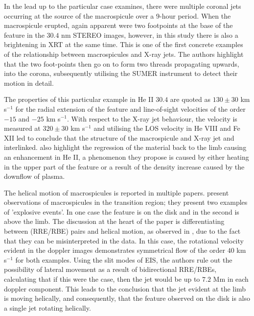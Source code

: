 In the lead up to the particular case \cite{Kamio2010} examines, there were multiple coronal jets occurring at the source of the macrospicule over a $9$-hour period.
When the macrospicule erupted, again apparent were two footpoints at the base of the feature in the $30.4$ nm STEREO images, however, in this study there is also a brightening in XRT at the same time. 
This is one of the first concrete examples of the relationship between macrospicules and X-ray jets.
The authors highlight that the two foot-points then go on to form two threads propagating upwards, into the corona, subsequently utilising the SUMER instrument to detect their motion in detail.

The properties of this particular example in He II $30.4$ are quoted as $130 \pm 30$ km s${^{-1}}$ for the radial extension of the feature and line-of-sight velocities of the order $-15$ and $-25$ km s${^{-1}}$.
With respect to the X-ray jet behaviour, the velocity is measured at $320 \pm 30$ km s${^{-1}}$ and utilising the LOS velocity in He VIII and Fe XII led \cite{Kamio2010} to conclude that the structure of the macrospicule and X-ray jet and interlinked.
\cite{Kamio2010} also highlight the regression of the material back to the limb causing an enhancement in He II, a phenomenon they propose is caused by either heating in the upper part of the feature or a result of the density increase caused by the downflow of plasma.

The helical motion of macrospicules is reported in multiple papers.
\cite{Curdt2011} present observations of macrospicules in the transition region; they present two examples of 'explosive events'.
In one case the feature is on the disk and in the second is above the limb.
The discussion at the heart of the paper is differentiating between (RRE/RBE) pairs and helical motion, as observed in \cite{Kuridze2015}, due to the fact that they can be misinterpreted in the data.
In this case, the rotational velocity evident in the doppler images demonstrates symmetrical flow of the order $40$ km s${^{-1}}$ for both examples.
Using the slit modes of EIS, the authors rule out the possibility of lateral movement as a result of bidirectional RRE/RBEs, calculating that if this were the case, then the jet would be up to $7.2$ Mm in each doppler component.
This leads to the conclusion that the jet evident at the limb is moving helically, and consequently, that the feature observed on the disk is also a single jet rotating helically.

